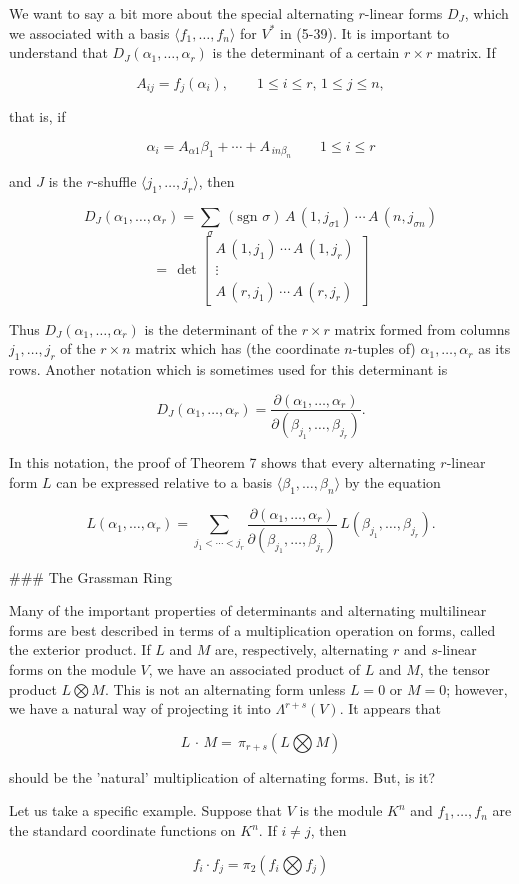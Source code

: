 We want to say a bit more about the special alternating \(r\)-linear forms \(D_{J}\), which we associated with a basis \(\langle f_{1},\ldots,f_{n}\rangle\) for \(V^{*}\) in (5-39). It is important to understand that \(D_{J}(\alpha_{1},\ldots,\alpha_{r})\) is the determinant of a certain \(r\times r\) matrix. If

\[A_{ij}=f_{j}(\alpha_{i}),\qquad 1\leq i\leq r,\,1\leq j\leq n,\]

that is, if

\[\alpha_{i}=A_{\alpha 1}\beta_{1}+\cdots+A_{\,in\beta_{n}}\qquad 1\leq i\leq r\]

and \(J\) is the \(r\)-shuffle \(\langle j_{1},\ldots,j_{r}\rangle\), then

\[D_{J}(\alpha_{1},\ldots,\alpha_{r}) =\sum_{\sigma}\,\left(\mbox{sgn }\sigma\right)\,A\,(1,j_{\sigma 1})\,\cdots\,A\,(n,j_{\sigma n})\] \[=\,\det\begin{bmatrix}A\,(1,j_{1})\,\cdots\,A\,(1,j_{r})\\ \vdots\\ A\,(r,j_{1})\,\cdots\,A\,(r,j_{r})\end{bmatrix}\]

Thus \(D_{J}(\alpha_{1},\ldots,\alpha_{r})\) is the determinant of the \(r\times r\) matrix formed from columns \(j_{1},\ldots,j_{r}\) of the \(r\times n\) matrix which has (the coordinate \(n\)-tuples of) \(\alpha_{1},\ldots,\alpha_{r}\) as its rows. Another notation which is sometimes used for this determinant is

\[D_{J}(\alpha_{1},\ldots,\alpha_{r})=\frac{\partial(\alpha_{1},\ldots,\alpha_{ r})}{\partial(\beta_{j_{1}},\ldots,\beta_{j_{r}})}.\]

In this notation, the proof of Theorem 7 shows that every alternating \(r\)-linear form \(L\) can be expressed relative to a basis \(\langle\beta_{1},\ldots,\beta_{n}\rangle\) by the equation

\[L(\alpha_{1},\ldots,\alpha_{r})=\sum_{j_{1}<\cdots<j_{r}}\frac{\partial( \alpha_{1},\ldots,\alpha_{r})}{\partial(\beta_{j_{1}},\ldots,\beta_{j_{r}})} \,L(\beta_{j_{1}},\ldots,\beta_{j_{r}}).\]

### The Grassman Ring

Many of the important properties of determinants and alternating multilinear forms are best described in terms of a multiplication operation on forms, called the exterior product. If \(L\) and \(M\) are, respectively, alternating \(r\) and \(s\)-linear forms on the module \(V\), we have an associated product of \(L\) and \(M\), the tensor product \(L\bigotimes M\). This is not an alternating form unless \(L=0\) or \(M=0\); however, we have a natural way of projecting it into \(\Lambda^{r+s}(V)\). It appears that

\[L\,\cdot\,M=\,\pi_{r+s}(L\bigotimes M)\]

should be the 'natural' multiplication of alternating forms. But, is it?

Let us take a specific example. Suppose that \(V\) is the module \(K^{n}\) and \(f_{1},\ldots,f_{n}\) are the standard coordinate functions on \(K^{n}\). If \(i\neq j\), then

\[f_{i}\cdot f_{j}=\pi_{2}(f_{i}\bigotimes f_{j})\] 